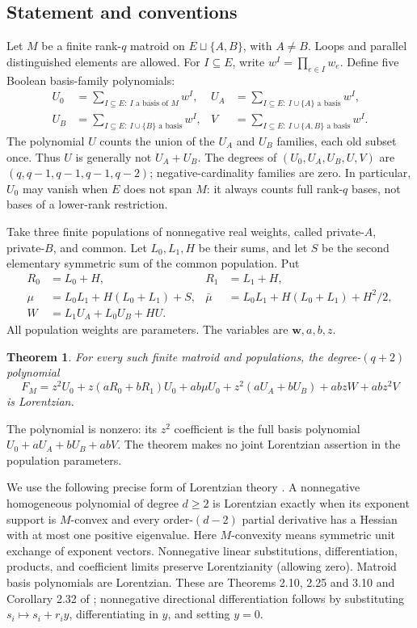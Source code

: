 \documentclass[11pt,a4paper]{article}
\newtheorem{theorem}{Theorem}[section]
\theoremstyle{remark}\newtheorem{remark}[theorem]{Remark}
\begin{document}
\subsection{Statement and conventions}
Let $M$ be a finite rank-$q$ matroid on $E\sqcup\{A,B\}$, with $A\ne B$. Loops and parallel distinguished elements are allowed. For $I\subseteq E$, write $w^I=\prod_{e\in I}w_e$. Define five Boolean basis-family polynomials:
\begin{align*}
 U_0&=\sum_{I\subseteq E:\ I\text{ a basis of }M}w^I,&
 U_A&=\sum_{I\subseteq E:\ I\cup\{A\}\text{ a basis}}w^I,\\
 U_B&=\sum_{I\subseteq E:\ I\cup\{B\}\text{ a basis}}w^I,&
 V&=\sum_{I\subseteq E:\ I\cup\{A,B\}\text{ a basis}}w^I.
\end{align*}
The polynomial $U$ counts the union of the $U_A$ and $U_B$ families, each old subset once. Thus $U$ is generally not $U_A+U_B$. The degrees of $(U_0,U_A,U_B,U,V)$ are $(q,q-1,q-1,q-1,q-2)$; negative-cardinality families are zero. In particular, $U_0$ may vanish when $E$ does not span $M$: it always counts full rank-$q$ bases, not bases of a lower-rank restriction.

Take three finite populations of nonnegative real weights, called private-$A$, private-$B$, and common. Let $L_0,L_1,H$ be their sums, and let $S$ be the second elementary symmetric sum of the common population. Put
\begin{align}
 R_0&=L_0+H, &R_1&=L_1+H,\nonumber\\
 \mu&=L_0L_1+H(L_0+L_1)+S,&
 \bar\mu&=L_0L_1+H(L_0+L_1)+H^2/2,\label{mrn:v:te:eq:params}\\
 W&=L_1U_A+L_0U_B+HU.\nonumber
\end{align}
All population weights are parameters. The variables are $\mathbf w,a,b,z$.
\begin{theorem}\label{mrn:v:te:thm:main}
For every such finite matroid and populations, the degree-$(q+2)$ polynomial
\begin{equation}\label{mrn:v:te:eq:main}
 F_M=z^2U_0+z(aR_0+bR_1)U_0+ab\mu U_0
       +z^2(aU_A+bU_B)+abzW+abz^2V
\end{equation}
is Lorentzian.
\end{theorem}
The polynomial is nonzero: its $z^2$ coefficient is the full basis polynomial
$U_0+aU_A+bU_B+abV$. The theorem makes no joint Lorentzian assertion in the population parameters.

We use the following precise form of Lorentzian theory \cite{b:BH}. A nonnegative homogeneous polynomial of degree $d\ge2$ is Lorentzian exactly when its exponent support is $M$-convex and every order-$(d-2)$ partial derivative has a Hessian with at most one positive eigenvalue. Here $M$-convexity means symmetric unit exchange of exponent vectors. Nonnegative linear substitutions, differentiation, products, and coefficient limits preserve Lorentzianity (allowing zero). Matroid basis polynomials are Lorentzian. These are Theorems 2.10, 2.25 and 3.10 and Corollary 2.32 of \cite{b:BH}; nonnegative directional differentiation follows by substituting $s_i\mapsto s_i+r_i y$, differentiating in $y$, and setting $y=0$.
\end{document}
